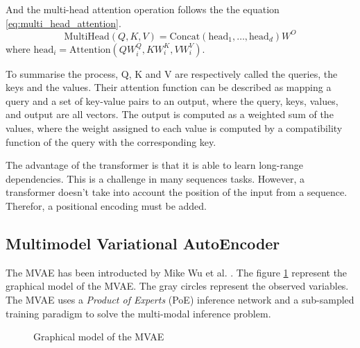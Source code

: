 \documentclass[12pt]{report}
\begin{document}
And the multi-head attention operation follows the the equation \ref{eq:multi_head_attention}.
\begin{equation}
    \text{MultiHead}(Q, K, V) = \text{Concat}(\text{head}_1, \dots, \text{head}_d) W^O
    \label{eq:multi_head_attention}
\end{equation}
where $\text{head}_i = \text{Attention}(QW_i^Q, KW_i^K, VW_i^V)$.

To summarise the process, Q, K and V are respectively called the queries, the keys and the values.
Their attention function can be described as mapping a query and a set of key-value pairs to an output, where the query, keys, values, and output are all vectors.
The output is computed as a weighted sum of the values, where the weight assigned to each value is computed by a compatibility function of the query with the corresponding key.

The advantage of the transformer is that it is able to learn long-range dependencies.
This is a challenge in many sequences tasks.
However, a transformer doesn't take into account the position of the input from a sequence. 
Therefor, a positional encoding must be added.

\subsection{Multimodel Variational AutoEncoder}
\label{sec:back:mvae}

The MVAE has been introducted by Mike Wu et al. \cite{wu_multimodal_2018}.
The figure \ref{fig:mvae_graph} represent the graphical model of the MVAE.
The gray circles represent the observed variables.
The MVAE uses a \textit{Product of Experts} (PoE) inference network and a sub-sampled training paradigm to solve the multi-modal inference problem.

\begin{figure}[htbp]
\begin{center}
\caption{Graphical model of the MVAE}
\label{fig:mvae_graph}
\end{center}
\end{figure}
\end{document}
